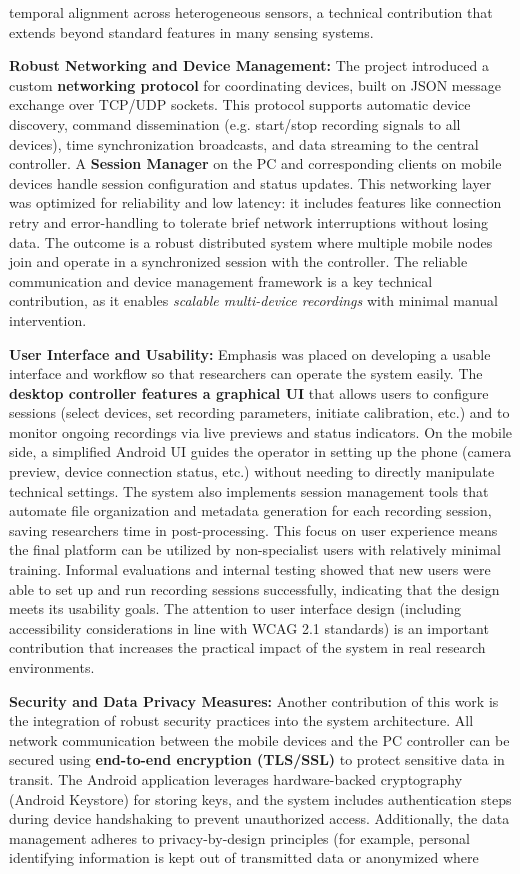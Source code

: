 temporal alignment across heterogeneous sensors, a technical contribution that extends beyond standard features in many sensing systems. \item \textbf{Robust Networking and Device Management:} The project introduced a custom \textbf{networking protocol} for coordinating devices, built on JSON message exchange over TCP/UDP sockets. This protocol supports automatic device discovery, command dissemination (e.g. start/stop recording signals to all devices), time synchronization broadcasts, and data streaming to the central controller. A \textbf{Session Manager} on the PC and corresponding clients on mobile devices handle session configuration and status updates. This networking layer was optimized for reliability and low latency: it includes features like connection retry and error-handling to tolerate brief network interruptions without losing data. The outcome is a robust distributed system where multiple mobile nodes join and operate in a synchronized session with the controller. The reliable communication and device management framework is a key technical contribution, as it enables \textit{scalable multi-device recordings} with minimal manual intervention. \item \textbf{User Interface and Usability:} Emphasis was placed on developing a usable interface and workflow so that researchers can operate the system easily. The \textbf{desktop controller features a graphical UI} that allows users to configure sessions (select devices, set recording parameters, initiate calibration, etc.) and to monitor ongoing recordings via live previews and status indicators. On the mobile side, a simplified Android UI guides the operator in setting up the phone (camera preview, device connection status, etc.) without needing to directly manipulate technical settings. The system also implements session management tools that automate file organization and metadata generation for each recording session, saving researchers time in post-processing. This focus on user experience means the final platform can be utilized by non-specialist users with relatively minimal training. Informal evaluations and internal testing showed that new users were able to set up and run recording sessions successfully, indicating that the design meets its usability goals. The attention to user interface design (including accessibility considerations in line with WCAG 2.1 standards) is an important contribution that increases the practical impact of the system in real research environments. \item \textbf{Security and Data Privacy Measures:} Another contribution of this work is the integration of robust security practices into the system architecture. All network communication between the mobile devices and the PC controller can be secured using \textbf{end-to-end encryption (TLS/SSL)} to protect sensitive data in transit. The Android application leverages hardware-backed cryptography (Android Keystore) for storing keys, and the system includes authentication steps during device handshaking to prevent unauthorized access. Additionally, the data management adheres to privacy-by-design principles (for example, personal identifying information is kept out of transmitted data or anonymized where 